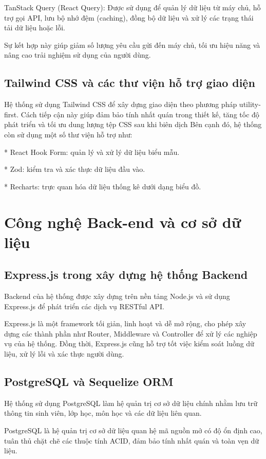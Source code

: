 \documentclass[../DoAn.tex]{subfiles}
\begin{document}
TanStack Query (React Query): Được sử dụng để quản lý dữ liệu từ máy chủ, hỗ trợ gọi API, lưu bộ nhớ đệm (caching), đồng bộ dữ liệu và xử lý các trạng thái tải dữ liệu hoặc lỗi.

Sự kết hợp này giúp giảm số lượng yêu cầu gửi đến máy chủ, tối ưu hiệu năng và nâng cao trải nghiệm sử dụng của người dùng.

\subsection{Tailwind CSS và các thư viện hỗ trợ giao diện}
\label{subsection:3.1.4}
Hệ thống sử dụng Tailwind CSS để xây dựng giao diện theo phương pháp utility-first. Cách tiếp cận này giúp đảm bảo tính nhất quán trong thiết kế, tăng tốc độ phát triển và tối ưu dung lượng tệp CSS sau khi biên dịch
Bên cạnh đó, hệ thống còn sử dụng một số thư viện hỗ trợ như:

* React Hook Form: quản lý và xử lý dữ liệu biểu mẫu.

* Zod: kiểm tra và xác thực dữ liệu đầu vào.

* Recharts: trực quan hóa dữ liệu thống kê dưới dạng biểu đồ.

\section{Công nghệ Back-end và cơ sở dữ liệu}
\label{section:3.2}
\subsection{Express.js trong xây dựng hệ thống Backend}
\label{subsection:3.2.1}
Backend của hệ thống được xây dựng trên nền tảng Node.js \cite{nodejs} và sử dụng Express.js \cite{express} để phát triển các dịch vụ RESTful API.

Express.js \cite{express} là một framework tối giản, linh hoạt và dễ mở rộng, cho phép xây dựng các thành phần như Router, Middleware và Controller để xử lý các nghiệp vụ của hệ thống. Đồng thời, Express.js cũng hỗ trợ tốt việc kiểm soát luồng dữ liệu, xử lý lỗi và xác thực người dùng.
\subsection{PostgreSQL và Sequelize ORM}
\label{subsection:3.2.2}
Hệ thống sử dụng PostgreSQL \cite{postgresql} làm hệ quản trị cơ sở dữ liệu chính nhằm lưu trữ thông tin sinh viên, lớp học, môn học và các dữ liệu liên quan.

PostgreSQL \cite{postgresql} là hệ quản trị cơ sở dữ liệu quan hệ mã nguồn mở có độ ổn định cao, tuân thủ chặt chẽ các thuộc tính ACID, đảm bảo tính nhất quán và toàn vẹn dữ liệu.
\end{document}
